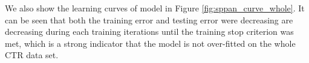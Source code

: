 We also show the learning curves of {\sppan} model in Figure
\ref{fig:sppan_curve_whole}. It can be seen that both the training
error and testing error were decreasing are decreasing during each
training iterations until the training stop criterion was met, which
is a strong indicator that the {\sppan} model is not over-fitted on the
whole CTR data set.
